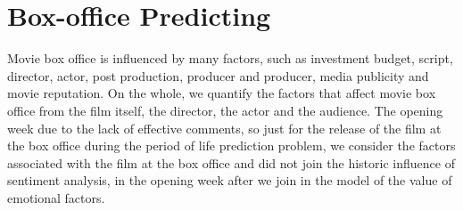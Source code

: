 \section{Box-office Predicting}
Movie box office is influenced by many factors, such as investment budget, script, director, actor, post production, producer and producer, media publicity and movie reputation. On the whole, we quantify the factors that affect movie box office from the film itself, the director, the actor and the audience. The opening week due to the lack of effective comments, so just for the release of the film at the box office during the period of life prediction problem, we consider the factors associated with the film at the box office and did not join the historic influence of sentiment analysis, in the opening week after we join in the model of the value of emotional factors.

\label{sec:predict}
